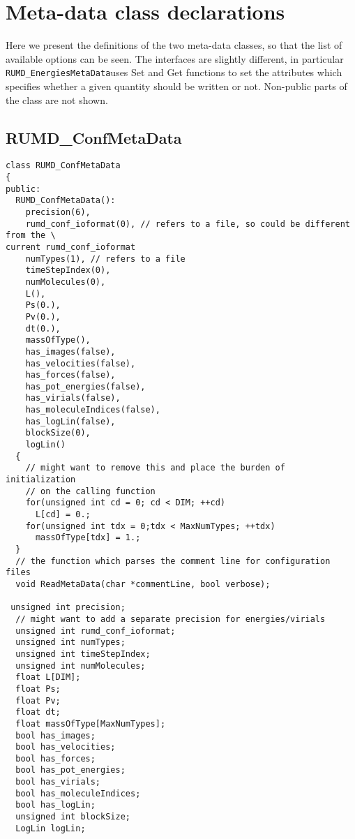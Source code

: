 \documentclass[a4paper]{article}
\begin{document}
\appendix

\section{Meta-data class declarations}

Here we present the definitions of the two meta-data classes, so
that the list of available options can be seen. The interfaces are
slightly different, in particular \verb|RUMD_EnergiesMetaData|uses
Set and Get functions to set the attributes which specifies whether a given
quantity should be written or not. Non-public parts of the class are not shown.

\subsection{RUMD\_ConfMetaData}




\begin{verbatim}
class RUMD_ConfMetaData
{
public:
  RUMD_ConfMetaData():
    precision(6),
    rumd_conf_ioformat(0), // refers to a file, so could be different from the \
current rumd_conf_ioformat                                                      
    numTypes(1), // refers to a file                                            
    timeStepIndex(0),
    numMolecules(0),
    L(),
    Ps(0.),
    Pv(0.),
    dt(0.),
    massOfType(),
    has_images(false),
    has_velocities(false),
    has_forces(false),
    has_pot_energies(false),
    has_virials(false),
    has_moleculeIndices(false),
    has_logLin(false),
    blockSize(0),
    logLin()
  {
    // might want to remove this and place the burden of initialization         
    // on the calling function                                                  
    for(unsigned int cd = 0; cd < DIM; ++cd)
      L[cd] = 0.;
    for(unsigned int tdx = 0;tdx < MaxNumTypes; ++tdx)
      massOfType[tdx] = 1.;
  }
  // the function which parses the comment line for configuration files         
  void ReadMetaData(char *commentLine, bool verbose);

 unsigned int precision;
  // might want to add a separate precision for energies/virials                
  unsigned int rumd_conf_ioformat;
  unsigned int numTypes;
  unsigned int timeStepIndex;
  unsigned int numMolecules;
  float L[DIM];
  float Ps;
  float Pv;
  float dt;
  float massOfType[MaxNumTypes];
  bool has_images;
  bool has_velocities;
  bool has_forces;
  bool has_pot_energies;
  bool has_virials;
  bool has_moleculeIndices;
  bool has_logLin;
  unsigned int blockSize;
  LogLin logLin;
\end{verbatim}
\end{document}
